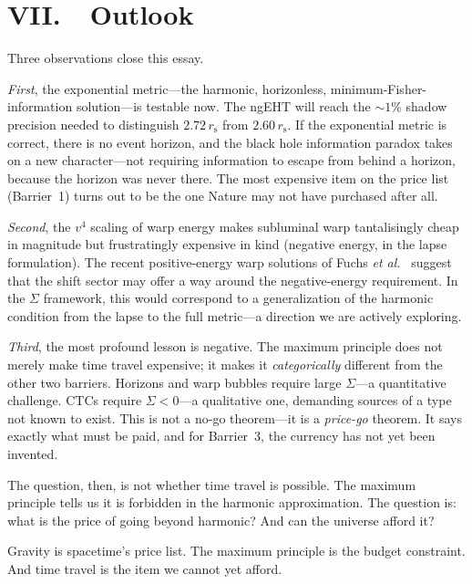 \documentclass[12pt]{article}
\newcommand{\rs}{r_{\mathrm{s}}}
\begin{document}
\section*{VII.\ \ Outlook}

Three observations close this essay.

\emph{First}, the exponential metric---the harmonic, horizonless,
minimum-Fisher-information solution---is testable now. The ngEHT will
reach the ${\sim}1\%$ shadow precision needed to distinguish
$2.72\,\rs$ from $2.60\,\rs$. If the exponential metric is correct,
there is no event horizon, and the black hole information paradox
takes on a new character---not requiring information to escape from
behind a horizon, because the horizon was never there. The most expensive item on the
price list (Barrier~1) turns out to be the one Nature may not have
purchased after all.

\emph{Second}, the $v^4$ scaling of warp energy makes subluminal warp
tantalisingly cheap in magnitude but frustratingly expensive in kind
(negative energy, in the lapse formulation). The recent positive-energy
warp solutions of Fuchs \emph{et al.}~\cite{Fuchs2024} suggest that
the shift sector may offer a way around the negative-energy
requirement. In the $\Sigma$ framework, this would correspond to a
generalization of the harmonic condition from the lapse to the full
metric---a direction we are actively exploring.

\emph{Third}, the most profound lesson is negative. The maximum
principle does not merely make time travel expensive; it makes it
\emph{categorically} different from the other two barriers. Horizons
and warp bubbles require large $\Sigma$---a quantitative challenge. CTCs
require $\Sigma < 0$---a qualitative one, demanding sources of a
type not known to exist. This is not a no-go theorem---it is a
\emph{price-go} theorem. It says exactly what must be paid, and for
Barrier~3, the currency has not yet been invented.



The question, then, is not whether time travel is possible. The
maximum principle tells us it is forbidden in the harmonic
approximation. The question is: what is the price of going beyond
harmonic? And can the universe afford it?

\bigskip

Gravity is spacetime's price list. The maximum principle is the budget
constraint. And time travel is the item we cannot yet afford.
\end{document}
